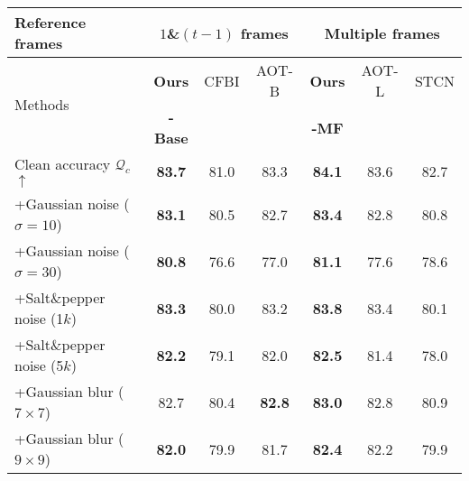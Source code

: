 \documentclass[sigconf]{acmart}
\begin{document}
\renewcommand{\arraystretch}{1}
\begin{table}[t]
	\resizebox{0.48\textwidth}{!}
	{
\begin{tabular}{@{}l|ccc|ccc@{}}
\toprule Reference frames   & \multicolumn{3}{c|}{$1$\&$(t-1)$ frames}   & \multicolumn{3}{c}{Multiple frames}     \\ \midrule
             
         \multirow{2}{1in}{Methods}    & \multicolumn{1}{c}{\textbf{Ours}} & {CFBI} & {AOT-B}    & {\textbf{Ours}}  & {AOT-L}    & {STCN}     \\
& \multicolumn{1}{c}{\textbf{-Base}} & {\cite{yang2020collaborative}} & {\cite{yang2021associating}}    & {\textbf{-MF}}  & {\cite{yang2021associating}}    & {\cite{cheng2021rethinking}}     \\
             \cmidrule{1-7}
Clean accuracy $\mathcal{Q}_c$  $\uparrow$     & \textbf{83.7}      & 81.0                   & 83.3                     & \textbf{84.1}               & 83.6                     & 82.7                       \\ \midrule  \midrule
 +Gaussian noise ($\sigma=10$)     &    \textbf{83.1}  & 80.5       & 82.7                       &     \textbf{83.4}             &   82.8                         &      80.8                  \\
+Gaussian noise ($\sigma=30$) & \textbf{80.8}  &    76.6   
           &   77.0     & \textbf{81.1}                       &   77.6                       &   78.6                                               \\ 
+Salt\&pepper noise (1$k$)   &   \textbf{83.3}               & 80.0       & 83.2                  &          \textbf{83.8}                   &   83.4                         &    80.1                      \\
+Salt\&pepper noise (5$k$)  & \textbf{82.2}           & 79.1                          &  82.0                          &   \textbf{82.5}                    & 81.4                     &  78.0                          \\
+Gaussian blur ($7\times7$)   & {82.7} 
             & 80.4      &  \textbf{82.8}  & \textbf{83.0}     & 82.8                        & 80.9                          \\
+Gaussian blur ($9\times9$)    & \textbf{82.0}    & 79.9                           &  81.7                     &   \textbf{82.4}                          &  82.2                          & 79.9                        \\\midrule

\end{tabular}}
\end{table}
\end{document}
